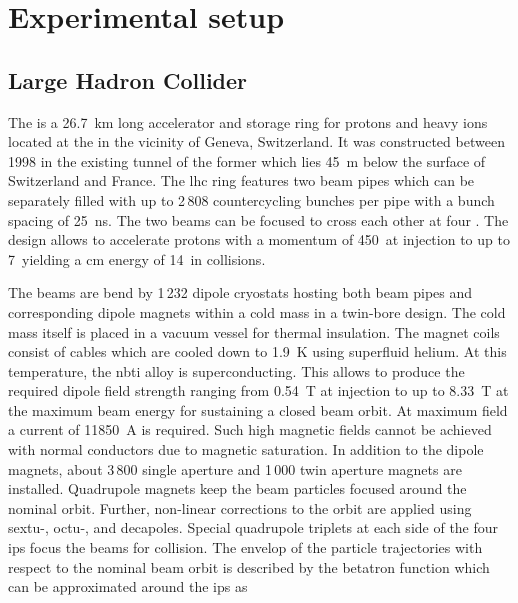 \chapter{Experimental setup}
\label{ch:exp}


\section{Large Hadron Collider}

The  is a 26.7~km long accelerator and storage ring for protons and heavy ions located at the  in the vicinity of Geneva, Switzerland. It was constructed between 1998 in the existing tunnel of the former  which lies 45~m below the surface of Switzerland and France. The \gls{lhc} ring features two beam pipes which can be separately filled with up to 2\,808 countercycling bunches per pipe with a bunch spacing of 25~ns. The two beams can be focused to cross each other at four . The design allows to accelerate protons with a momentum of 450~\GeV at injection to up to 7~\TeV yielding a \acrlong{cm} energy of 14~\TeV in collisions.

The beams are bend by 1\,232 dipole cryostats hosting both beam pipes and corresponding dipole magnets within a cold mass in a twin-bore design. The cold mass itself is placed in a vacuum vessel for thermal insulation. The magnet coils consist of   cables which are cooled down to 1.9~K using superfluid helium. At this temperature, the \gls{nbti} alloy is superconducting. This allows to produce the required dipole field strength ranging from 0.54~T at injection to up to 8.33~T at the maximum beam energy for sustaining a closed beam orbit. At maximum field a current of 11850~A is required. Such high magnetic fields cannot be achieved with normal conductors due to magnetic saturation. In addition to the dipole magnets, about 3\,800 single aperture and 1\,000 twin aperture magnets are installed. Quadrupole magnets keep the beam particles focused around the nominal orbit. Further, non-linear corrections to the orbit are applied using sextu-, octu-, and decapoles. Special quadrupole triplets at each side of the four \glspl{ip} focus the beams for collision. The envelop of the particle trajectories with respect to the nominal beam orbit is described by the betatron function which can be approximated around the \glspl{ip} as 

